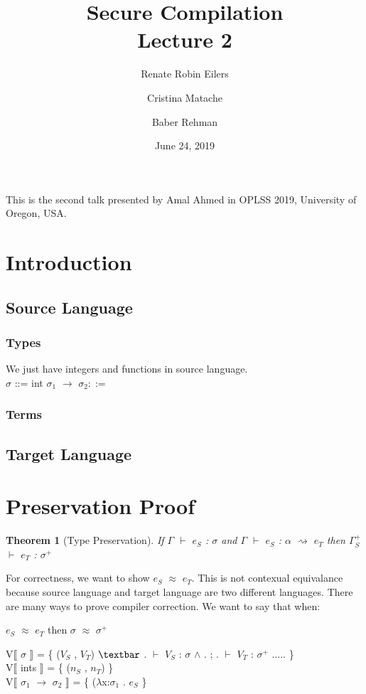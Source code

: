 \documentclass{article}
\title{Secure Compilation \\ \Large{Lecture 2}}
\author{Renate Robin Eilers  \and Cristina Matache \and Baber Rehman}
\date{June 24, 2019}
\newtheorem{theorem}{Theorem}[section]
\begin{document}
\maketitle

This is the second talk presented by Amal Ahmed in OPLSS 2019, University of Oregon, USA.

\section{Introduction}

\subsection{Source Language}

\subsubsection{Types}

We just have integers and functions in source language. \\

$\sigma$ ::= int \textbar \hspace{0.1cm} $\sigma_1$ $\rightarrow$ $\sigma_2 ::= $

\subsubsection{Terms}

\subsection{Target Language}

\section{Preservation Proof}

\begin{theorem}[Type Preservation]
If $\Gamma$ $\vdash$ $e_S$ : $\sigma$ and  $\Gamma$ $\vdash$ $e_S$ : $\alpha$ $\rightsquigarrow$ $e_T$ then $\Gamma_S^+$ $\vdash$ $e_T$ : $\sigma^+$
\end{theorem}

For correctness, we want to show $e_S$ $\approx$ $e_T$. This is not contexual equivalance because source language and target language are two different languages.
There are many ways to prove compiler correction. We want to say that when:
\begin{center}
 $e_S$ $\approx$ $e_T$ then $\sigma$ $\approx$ $\sigma^+$
\end{center}
V$\llbracket$ $\sigma$ $\rrbracket$  = \{  ($V_S$ , $V_T$) $\textbar$ . $\vdash$ $V_{S}$ : $\sigma$ $\wedge$ . ; . $\vdash$ $V_{T}$ : $\sigma^+$ ..... \} \\
V$\llbracket$ ints $\rrbracket$ = \{ ($n_S$ , $n_T$) \} \\
V$\llbracket$ $\sigma_1$ $\rightarrow$ $\sigma_2$ $\rrbracket$ = \{ ($\lambda$x:$\sigma_1$ . $e_S$ \}
\end{document}
